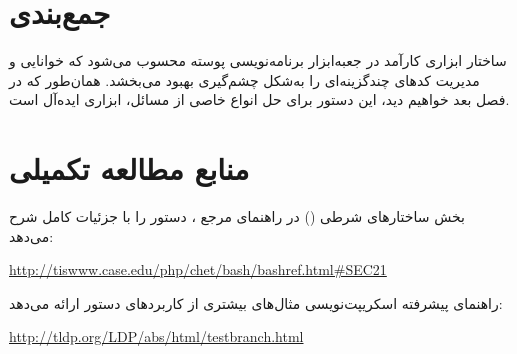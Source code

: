 \section{جمع‌بندی}

ساختار  ابزاری کارآمد در جعبه‌ابزار برنامه‌نویسی پوسته محسوب می‌شود که خوانایی و مدیریت کدهای چندگزینه‌ای را به‌شکل چشم‌گیری بهبود می‌بخشد. همان‌طور که در فصل بعد خواهیم دید، این دستور برای حل انواع خاصی از مسائل، ابزاری ایده‌آل است.

\section{منابع مطالعه تکمیلی}

بخش ساختارهای شرطی () در راهنمای مرجع ، دستور  را با جزئیات کامل شرح می‌دهد:

\begin{latin}
\url{http://tiswww.case.edu/php/chet/bash/bashref.html#SEC21}
\end{latin}

راهنمای پیشرفته اسکریپت‌نویسی  مثال‌های بیشتری از کاربردهای دستور  ارائه می‌دهد:

\begin{latin}
\url{http://tldp.org/LDP/abs/html/testbranch.html}
\end{latin}